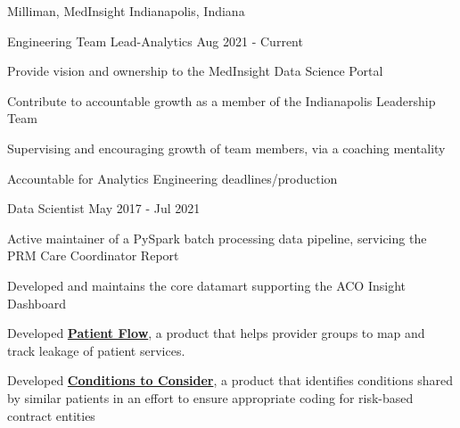 

\begin{cventries}

  \cventry
    {}
    {Milliman, MedInsight}
    {}
    {Indianapolis, Indiana} %
    {}
    {
      \begin{cvsubentries}
         \cvsubentry 
	   {Engineering Team Lead-Analytics} %
	   {}
           {Aug 2021 - Current} %
           {
             \begin{cvitems} %
               \item {Provide vision and ownership to the MedInsight Data Science Portal}
	       \item {Contribute to accountable growth as a member of the Indianapolis Leadership Team}
               \item {Supervising and encouraging growth of team members, via a coaching mentality}
	       \item {Accountable for Analytics Engineering deadlines/production}
             \end{cvitems}
           }
	 \cvsubentry
           {Data Scientist} %
	   {}
           {May 2017 - Jul 2021} %
           {
             \begin{cvitems} %
               \item {Active maintainer of a PySpark batch processing data pipeline, servicing the PRM Care Coordinator Report}
               \item {Developed and maintains the core datamart supporting the ACO Insight Dashboard}
               \item {Developed \href{http://www.medinsight.milliman.com/uploadedFiles/MedInsight_Site/About/MedInsight-Patient-Flow.pdf}{\textbf{Patient Flow}}, a product that helps provider groups to map and track leakage of patient services.}
	       \item {Developed \href{http://assets.milliman.com/ektron/medinsight-machine-learning-conditions-consider.pdf}{\textbf{Conditions to Consider}}, a product that identifies conditions shared by similar patients in an effort to ensure appropriate coding for risk-based contract entities}

\end{cvitems}}
\end{cvsubentries}}
\end{cventries}
